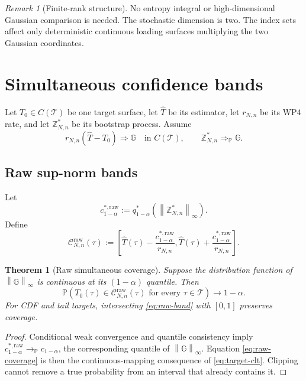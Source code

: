 \documentclass[11pt]{article}
\newtheorem{theorem}[assumption]{Theorem}
\theoremstyle{remark}
\newtheorem{remark}[assumption]{Remark}
\newcommand{\Pp}{\mathbb P}
\newcommand{\cT}{\mathcal T}
\newcommand{\cC}{\mathcal C}
\newcommand{\norm}[1]{\left\lVert #1\right\rVert}
\begin{document}
\begin{remark}[Finite-rank structure]
No entropy integral or high-dimensional Gaussian comparison is needed. The stochastic dimension is two. The index sets affect only deterministic continuous loading surfaces multiplying the two Gaussian coordinates.
\end{remark}

\section{Simultaneous confidence bands}

Let $T_0\in C(\cT)$ be one target surface, let $\widehat T$ be its estimator, let $r_{N,n}$ be its WP4 rate, and let $\mathbb Z_{N,n}^*$ be its bootstrap process. Assume
\begin{equation}\label{eq:target-clt}
 r_{N,n}(\widehat T-T_0)\Rightarrow\mathbb G
 \quad\text{in }C(\cT),
 \qquad
 \mathbb Z_{N,n}^*\Rightarrow_{\Pp}\mathbb G.
\end{equation}

\subsection{Raw sup-norm bands}

Let
\begin{equation}\label{eq:craw}
 c_{1-\alpha}^{*,\mathrm{raw}}
 :=
 q_{1-\alpha}^*
 \left(\norm{\mathbb Z_{N,n}^*}_\infty\right).
\end{equation}
Define
\begin{equation}\label{eq:raw-band}
 \cC_{N,n}^{\mathrm{raw}}(\tau)
 :=
 \left[
 \widehat T(\tau)-\frac{c_{1-\alpha}^{*,\mathrm{raw}}}{r_{N,n}},
 \widehat T(\tau)+\frac{c_{1-\alpha}^{*,\mathrm{raw}}}{r_{N,n}}
 \right].
\end{equation}

\begin{theorem}[Raw simultaneous coverage]\label{thm:raw-band}
Suppose the distribution function of $\norm{\mathbb G}_\infty$ is continuous at its $(1-\alpha)$ quantile. Then
\begin{equation}\label{eq:raw-coverage}
 \Pp\left(
 T_0(\tau)\in\cC_{N,n}^{\mathrm{raw}}(\tau)
 \text{ for every }\tau\in\cT
 \right)
 \longrightarrow1-\alpha.
\end{equation}
For CDF and tail targets, intersecting \eqref{eq:raw-band} with $[0,1]$ preserves coverage.
\end{theorem}

\begin{proof}
Conditional weak convergence and quantile consistency imply
$c_{1-\alpha}^{*,\mathrm{raw}}\to_{\Pp}c_{1-\alpha}$, the corresponding quantile of $\norm{\mathbb G}_\infty$. Equation \eqref{eq:raw-coverage} is then the continuous-mapping consequence of \eqref{eq:target-clt}. Clipping cannot remove a true probability from an interval that already contains it.
\end{proof}
\end{document}

